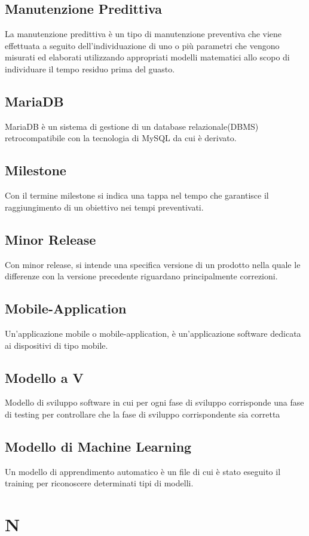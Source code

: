 \subsection{Manutenzione Predittiva}  La manutenzione predittiva è un tipo di manutenzione preventiva che viene effettuata a seguito dell'individuazione di uno o più parametri che vengono misurati ed elaborati utilizzando appropriati modelli matematici allo scopo di individuare il tempo residuo prima del guasto.
\subsection{MariaDB}  MariaDB è un sistema di gestione di un database relazionale(DBMS) retrocompatibile con la tecnologia di MySQL da cui è derivato.
\subsection{Milestone}  Con il termine milestone si indica una tappa nel tempo che garantisce il raggiungimento di un obiettivo nei tempi preventivati.
\subsection{Minor Release}   Con minor release, si intende una specifica versione di un prodotto nella quale le differenze con la versione precedente riguardano principalmente correzioni.
\subsection{Mobile-Application}  Un'applicazione mobile o mobile-application, è un'applicazione software dedicata ai dispositivi di tipo mobile.
\subsection{Modello a V}  Modello di sviluppo software in cui per ogni fase di sviluppo corrisponde una fase di testing per controllare che la fase di sviluppo corrispondente sia corretta
\subsection{Modello di Machine Learning}  Un modello di apprendimento automatico è un file di cui è stato eseguito il training per riconoscere determinati tipi di modelli.

\newpage \section{N}
